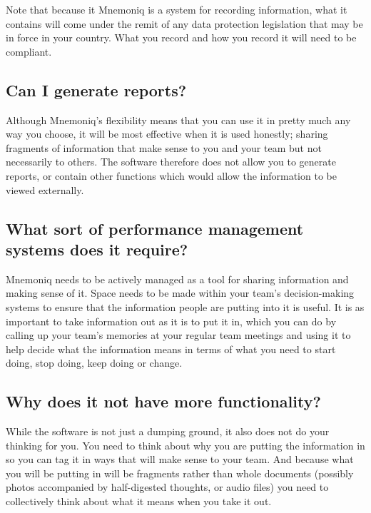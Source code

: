 \documentclass[letterpaper,10pt,english]{sphinxmanual}
\begin{document}
Note that because it Mnemoniq is a system for recording information,
what it contains will come under the remit of any data protection
legislation that may be in force in your country.  What you record and
how you record it will need to be compliant.


\subsection{Can I generate reports?}
\label{user-guide:can-i-generate-reports}
Although Mnemoniq's flexibility means that you can use it in pretty
much any way you choose, it will be most effective when it is used
honestly; sharing fragments of information that make sense to you and
your team but not necessarily to others.  The software therefore does
not allow you to generate reports, or contain other functions which
would allow the information to be viewed externally.


\subsection{What sort of performance management systems does it require?}
\label{user-guide:what-sort-of-performance-management-systems-does-it-require}
Mnemoniq needs to be actively managed as a tool for sharing
information and making sense of it.  Space needs to be made within
your team's decision-making systems to ensure that the information
people are putting into it is useful.  It is as important to take
information out as it is to put it in, which you can do by calling up
your team's memories at your regular team meetings and using it to
help decide what the information means in terms of what you need to
start doing, stop doing, keep doing or change.


\subsection{Why does it not have more functionality?}
\label{user-guide:why-does-it-not-have-more-functionality}
While the software is not just a dumping ground, it also does not do
your thinking for you.  You need to think about why you are putting
the information in so you can tag it in ways that will make sense to
your team.  And because what you will be putting in will be fragments
rather than whole documents (possibly photos accompanied by
half-digested thoughts, or audio files) you need to collectively think
about what it means when you take it out.
\end{document}
